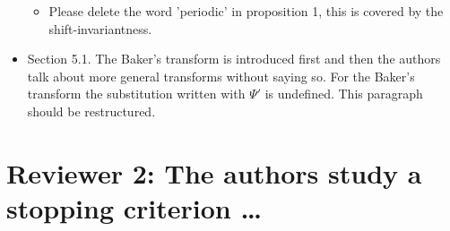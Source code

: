 \documentclass{amsart}
\begin{document}
\begin{itemize}
\begin{itemize}
\item Please delete the word 'periodic' in proposition 1, this is covered by the
shift-invariantness.
\end{itemize}

\item Section 5.1. The Baker's transform is introduced first and then the authors talk about
more general transforms without saying so. For the Baker's transform the
substitution written with $\Psi'$ is undefined. This paragraph should be
restructured.

\end{itemize}



\section*{Reviewer 2: The authors study a stopping criterion \ldots}
\end{document}
